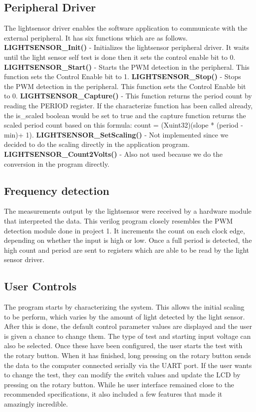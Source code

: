 \documentclass[11pt]{article}
\begin{document}
\subsection{Peripheral Driver}
The lightsensor driver enables the software application to communicate with the external peripheral. It has six functions which are as follows.
\textbf{LIGHTSENSOR_Init()} - Initializes the lightsensor peripheral driver. It waits until the light sensor self test is done then it sets the control enable bit to 0.
\textbf{LIGHTSENSOR_Start()} - Starts the PWM detection in the peripheral. This function sets the Control Enable bit to 1.
\textbf{LIGHTSENSOR_Stop()} - Stops the PWM detection in the peripheral. This function sets the Control Enable bit to 0.
\textbf{LIGHTSENSOR_Capture()} - This function returns the period count by reading the PERIOD register. If the characterize function has been called already, the is_scaled boolean would be set to true and the capture function returns the scaled period count based on this formula: count = (Xuint32)(slope * (period - min)+ 1).
\textbf{LIGHTSENSOR_SetScaling() } - Not implemented since we decided to do the scaling directly in the application program.
\textbf{LIGHTSENSOR_Count2Volts()} - Also not used because we do the conversion in the program directly.

%  

\subsection{Frequency detection}
The measurements output by the lightsensor were received by a hardware module that interpreted the data.  This verilog program closely resembles the PWM detection module done in project 1.  It increments the count on each clock edge, depending on whether the input is high or low.  Once a full period is detected, the high count and period are sent to registers which are able to be read by the light sensor driver.  

\subsection{User Controls} 
The program starts by characterizing the system.  This allows the initial scaling to be perform, which varies by the amount of light detected by the light sensor. After this is done, the default control parameter values are displayed and the user is given a chance to change them.  The type of test and starting input voltage can also be selected.  Once these have been configured, the user starts the test with the rotary button.  When it has finished, long pressing on the rotary button sends the data to the computer connected serially via the UART port.  If the user wants to change the test, they can modify the switch values and update the LCD by pressing on the rotary button.  While he user interface remained close to the recommended specifications, it also included a few features that made it amazingly incredible.
 
\end{document}
